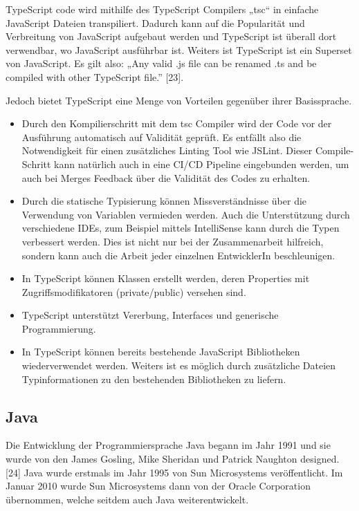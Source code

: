 TypeScript code wird mithilfe des TypeScript Compilers „tsc“ in einfache JavaScript 
Dateien transpiliert. Dadurch kann auf die Popularität und Verbreitung von JavaScript 
aufgebaut werden und TypeScript ist überall dort verwendbar, wo JavaScript 
ausführbar ist. Weiters ist TypeScript ist ein Superset von JavaScript. 
Es gilt also: „Any valid .js file can be renamed .ts and be compiled with other 
TypeScript file.” [23]. 

Jedoch bietet TypeScript eine Menge von Vorteilen 
gegenüber ihrer Basissprache.
\begin{itemize}
  \item Durch den Kompilierschritt mit dem tsc Compiler wird der Code vor der Ausführung automatisch auf Validität geprüft. Es entfällt also die Notwendigkeit für einen zusätzliches Linting Tool wie JSLint. Dieser Compile-Schritt kann natürlich auch in eine CI/CD Pipeline eingebunden werden, um auch bei Merges Feedback über die Validität des Codes zu erhalten.
  \item Durch die statische Typisierung können Missverständnisse über die Verwendung von Variablen vermieden werden. Auch die Unterstützung durch verschiedene IDEs, zum Beispiel mittels IntelliSense kann durch die Typen verbessert werden. Dies ist nicht nur bei der Zusammenarbeit hilfreich, sondern kann auch die Arbeit jeder einzelnen EntwicklerIn beschleunigen.
  \item In TypeScript können Klassen erstellt werden, deren Properties mit Zugriffsmodifikatoren (private/public) versehen sind.
  \item TypeScript unterstützt Vererbung, Interfaces und generische Programmierung.
  \item In TypeScript können bereits bestehende JavaScript Bibliotheken wiederverwendet werden. Weiters ist es möglich durch zusätzliche Dateien Typinformationen zu den bestehenden Bibliotheken zu liefern.
\end{itemize}

\subsection{Java}

Die Entwicklung der Programmiersprache Java begann im Jahr 1991 und sie 
wurde von den James Gosling, Mike Sheridan und Patrick Naughton designed. 
[24] Java wurde erstmals im Jahr 1995 von Sun Microsystems veröffentlicht. 
Im Januar 2010 wurde Sun Microsystems dann von der Oracle Corporation übernommen, 
welche seitdem auch Java weiterentwickelt.

